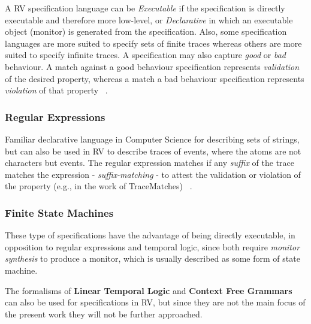 A RV specification language can be \textit{Executable} if the specification is directly executable and therefore more low-level, or \textit{Declarative} in which an executable object (monitor) is generated from the specification. Also, some specification languages are more suited to specify sets of finite traces whereas others are more suited to specify infinite traces. A specification may also capture \textit{good} or \textit{bad} behaviour. A match against a good behaviour specification represents \textit{validation} of the desired property, whereas a match a bad behaviour specification represents \textit{violation} of that property ~\cite{rv2}.

\subsubsection{Regular Expressions}
Familiar declarative language in Computer Science for describing sets of strings, but can also be used in RV to describe traces of events, where the atoms are not characters but events. The regular expression matches if any \textit{suffix} of the trace matches the expression - \textit{suffix-matching} - to attest the validation or violation of the property (e.g., in the work of TraceMatches) ~\cite{rvart}.

\subsubsection{Finite State Machines}
These type of specifications have the advantage of being directly executable, in opposition to regular expressions and temporal logic, since both require \textit{monitor synthesis} to produce a monitor, which is usually described as some form of state machine. 

\vspace{5mm}

The formalisms of \textbf{Linear Temporal Logic} and \textbf{Context Free Grammars} can also be used for specifications in RV, but since they are not the main focus of the present work they will not be further approached. 


